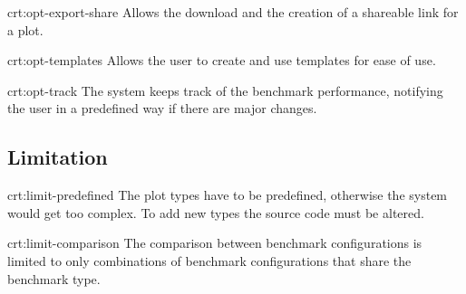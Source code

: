 {crt:opt-export-share}
{Allows the download and the creation of a shareable link for a \gls{plot}.}

{crt:opt-templates}
{Allows the \gls{user} to create and use \glspl{template} for ease of use.}

{crt:opt-track}
{The system keeps track of the benchmark performance, notifying the \gls{user} in a predefined way if there are major changes.}


\subsection{Limitation}

{crt:limit-predefined}
{The \gls{plot} types have to be predefined, otherwise the system would get too complex. To add new types the source code must be altered.}

{crt:limit-comparison}
{The comparison between \glspl{benchmark configuration} is limited to only combinations of \glspl{benchmark configuration} that share the benchmark type.}
